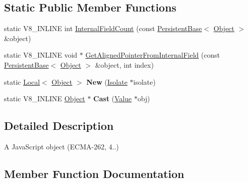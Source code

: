 \subsection*{Static Public Member Functions}
\begin{DoxyCompactItemize}
\item 
static V8\+\_\+\+I\+N\+L\+I\+N\+E int \hyperlink{classv8_1_1Object_a324a71142f621a32bfe5738648718370}{Internal\+Field\+Count} (const \hyperlink{classv8_1_1PersistentBase}{Persistent\+Base}$<$ \hyperlink{classv8_1_1Object}{Object} $>$ \&object)
\item 
static V8\+\_\+\+I\+N\+L\+I\+N\+E void $\ast$ \hyperlink{classv8_1_1Object_a65b5a3dc93c0774594f8b0f2ab5481c8}{Get\+Aligned\+Pointer\+From\+Internal\+Field} (const \hyperlink{classv8_1_1PersistentBase}{Persistent\+Base}$<$ \hyperlink{classv8_1_1Object}{Object} $>$ \&object, int index)
\item 
\hypertarget{classv8_1_1Object_a0c397b055e2f5050c6ffc33970669c4d}{}static \hyperlink{classv8_1_1Local}{Local}$<$ \hyperlink{classv8_1_1Object}{Object} $>$ {\bfseries New} (\hyperlink{classv8_1_1Isolate}{Isolate} $\ast$isolate)\label{classv8_1_1Object_a0c397b055e2f5050c6ffc33970669c4d}

\item 
\hypertarget{classv8_1_1Object_a1f9ac46d0b164197318ce81dc0ec1343}{}static V8\+\_\+\+I\+N\+L\+I\+N\+E \hyperlink{classv8_1_1Object}{Object} $\ast$ {\bfseries Cast} (\hyperlink{classv8_1_1Value}{Value} $\ast$obj)\label{classv8_1_1Object_a1f9ac46d0b164197318ce81dc0ec1343}

\end{DoxyCompactItemize}


\subsection{Detailed Description}
A Java\+Script object (E\+C\+M\+A-\/262, 4..) 

\subsection{Member Function Documentation}
\hypertarget{classv8_1_1Object_afeb999e9225dad0ca8605ed3015b268b}{}
